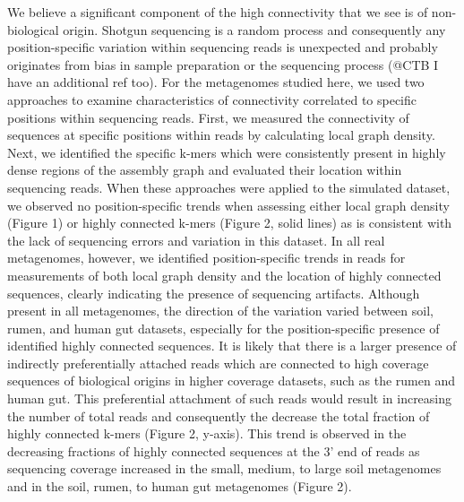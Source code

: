 \documentclass[10pt]{article}
\begin{document}


We believe a significant component of the high connectivity that we
see is of non-biological origin.  Shotgun sequencing is a random
process and consequently any position-specific variation within
sequencing reads is unexpected and probably originates from bias in
sample preparation or the sequencing process \cite{GomezAlvarez:2009p1334, Haas:2011jg, Keegan:2012p1336} (@CTB I have an additional ref too).  For the
metagenomes studied here, we used two approaches to examine
characteristics of connectivity correlated to specific positions
within sequencing reads.  First, we measured the connectivity of
sequences at specific positions within reads by calculating local
graph density.  Next, we identified the specific k-mers which were
consistently present in highly dense regions of the assembly graph and
evaluated their location within sequencing reads.  When these
approaches were applied to the simulated dataset, we observed no
position-specific trends when assessing either local graph density
(Figure 1) or highly connected k-mers (Figure 2, solid lines) as is
consistent with the lack of sequencing errors and variation in this
dataset.  In all real metagenomes, however, we identified
position-specific trends in reads for measurements of both local graph density
and the location of highly connected sequences, clearly indicating the
presence of sequencing artifacts.  Although present in all
metagenomes, the direction of the variation varied between soil,
rumen, and human gut datasets, especially for the position-specific
presence of identified highly connected sequences.  It is likely that
there is a larger presence of indirectly preferentially attached reads
which are connected to high coverage sequences of biological origins
in higher coverage datasets, such as the rumen and human gut.  This
preferential attachment of such reads would result in increasing the
number of total reads and consequently the decrease the total fraction
of highly connected k-mers (Figure 2, y-axis).  This trend is observed
in the decreasing fractions of highly connected sequences at the 3'
end of reads as sequencing coverage increased in the small, medium, to
large soil metagenomes and in the soil, rumen, to human gut
metagenomes (Figure 2).
\end{document}

